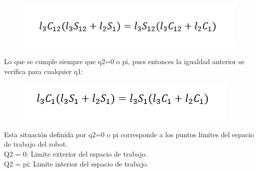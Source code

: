 \documentclass[11pt,a4paper,oldfontcommands,oneside]{memoir}
\begin{document}
\begin{figure}[h]
\includegraphics[scale=.9]{link3.png}
\end{figure}
Lo que se cumple siempre que q2=0 o pi, pues entonces la igualdad anterior se verifica para cualquier q1:
\begin{figure}[h]
\includegraphics[scale=.9]{link4.png}
\end{figure}
Esta situación definida por q2=0 o pi corresponde a los puntos limites del espacio de trabajo del robot.\\
Q2 = 0: Limite exterior del espacio de trabajo.\\
Q2 = pi: Limite interior del espacio de trabajo.\\
\end{document}

